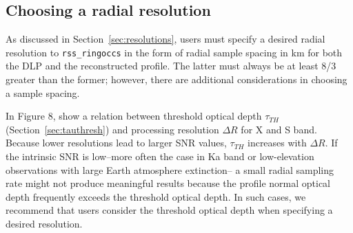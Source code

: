 \documentclass[titlepage, 12pt]{article}
\begin{document}
        \subsection{Choosing a radial resolution}
            As discussed in Section~\ref{sec:resolutions},
            users must specify a desired radial resolution to \texttt{rss\_ringoccs}
            in the form of radial sample spacing in km for both the DLP and
            the reconstructed profile. The latter must always be at least
            8/3 greater than the former; however, there are additional
            considerations in choosing a sample spacing.
            \par\hfill\par 
            In Figure 8, \citet{Marouf1986} show a relation between threshold 
            optical depth $\tau_{TH}$ (Section~\ref{sec:tauthresh}) and processing
            resolution $\Delta R$ for X and S band. Because lower resolutions 
            lead to larger SNR values, $\tau_{TH}$ increases with $\Delta R$. 
            If the intrinsic SNR is low--more often the case in Ka band or
            low-elevation observations with large Earth atmosphere extinction--
            a small radial sampling rate might not produce meaningful results
            because the profile normal optical depth frequently exceeds the 
            threshold optical depth. In such cases, we recommend that users consider
            the threshold optical depth when specifying a desired resolution.
\end{document}
